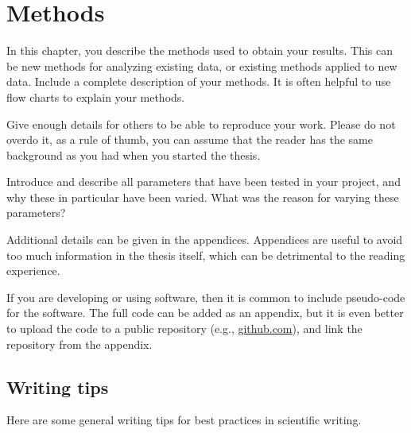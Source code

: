 \chapter{Methods}

In this chapter, you describe the methods used to obtain your results. This can be new methods for analyzing existing data, or existing methods applied to new data. Include a complete description of your methods. It is often helpful to use flow charts to explain your methods.

Give enough details for others to be able to reproduce your work. Please do not overdo it, as a rule of thumb, you can assume that the reader has the same background as you had when you started the thesis.

Introduce and describe all parameters that have been tested in your project, and why these in particular have been varied. What was the reason for varying these parameters?

Additional details can be given in the appendices. Appendices are useful to avoid too much information in the thesis itself, which can be detrimental to the reading experience.

If you are developing or using software, then it is common to include pseudo-code for the software. The full code can be added as an appendix, but it is even better to upload the code to a public repository (e.g., \url{github.com}), and link the repository from the appendix.

\section{Writing tips}

Here are some general writing tips for best practices in scientific writing.

